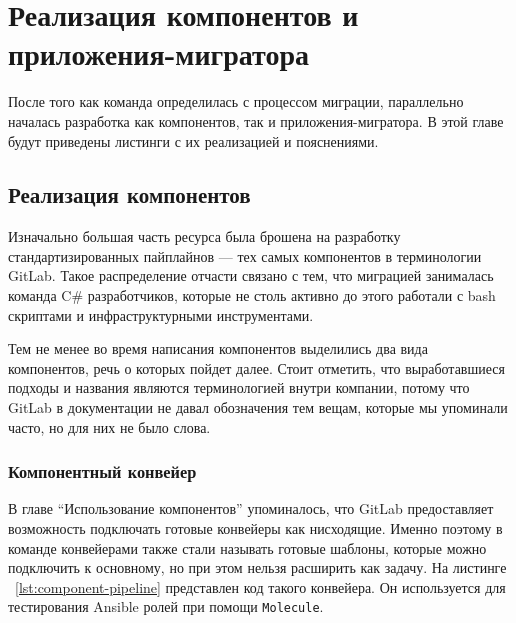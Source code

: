 \chapter{Реализация компонентов и приложения-мигратора} \label{ch:ch3}
После того как команда определилась с процессом миграции, параллельно началась разработка как компонентов, так и приложения-мигратора.
В этой главе будут приведены листинги с их реализацией и пояснениями.

\section{Реализация компонентов} \label{sec:components-impl}
Изначально большая часть ресурса была брошена на разработку стандартизированных пайплайнов — тех самых компонентов в терминологии GitLab.
Такое распределение отчасти связано с тем, что миграцией занималась команда C\# разработчиков, которые не столь активно до этого работали
с bash скриптами\cite{bash} и инфраструктурными инструментами.

Тем не менее во время написания компонентов выделились два вида компонентов, речь о которых пойдет далее.
Стоит отметить, что выработавшиеся подходы и названия являются терминологией внутри компании,
потому что GitLab в документации не давал обозначения тем вещам, которые мы упоминали часто, но для них не было слова.

\subsection{Компонентный конвейер} \label{subsec:component-pipeline}
В главе \enquote{Использование компонентов} упоминалось,
что GitLab предоставляет возможность подключать готовые конвейеры как нисходящие.
Именно поэтому в команде конвейерами также стали называть готовые шаблоны, которые можно подключить
к основному, но при этом нельзя расширить как задачу.
На листинге ~\ref{lst:component-pipeline} представлен код такого конвейера.
Он используется для тестирования Ansible ролей при помощи \texttt{Molecule}\cite{molecule}.

